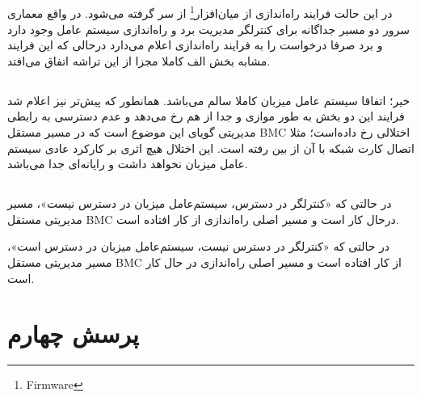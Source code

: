 \subsection{}
در این حالت فرایند راه‌اندازی از میان‌افزار\footnote{Firmware} از سر گرفته می‌شود. در واقع
معماری سرور دو مسیر جداگانه برای کنترلگر مدیریت برد و راه‌اندازی سیستم عامل وجود دارد و برد صرفا 
درخواست را به فرایند راه‌اندازی اعلام می‌دارد درحالی که این فرایند مشابه بخش الف کاملا مجزا از این تراشه اتفاق می‌افتد.

\subsection{}
خیر؛ اتفاقا سیستم عامل میزبان کاملا سالم می‌باشد. همانطور که پیش‌تر نیز اعلام شد فرایند این دو بخش به طور موازی و جدا از هم رخ می‌دهد و
عدم دسترسی به رابطی مدیریتی گویای این موضوع است که در مسیر مستقل BMC اختلالی رخ داده‌است؛ مثلا اتصال کارت شبکه با آن از بین رفته است.
این اختلال هیچ اثری بر کارکرد عادی سیستم عامل میزبان نخواهد داشت و رایانه‌ای جدا می‌باشد.

\subsection{}
در حالتی که «کنترلگر در دسترس، سیستم‌عامل میزبان در دسترس نیست»، مسیر مدیریتی مستقل BMC درحال کار است و مسیر اصلی راه‌اندازی از کار افتاده است.
\par
در حالتی که «کنترلگر در دسترس نیست، سیستم‌عامل میزبان در دسترس است»، مسیر مدیریتی مستقل BMC از کار افتاده است و مسیر اصلی راه‌اندازی در حال کار است.

\section{پرسش چهارم}

